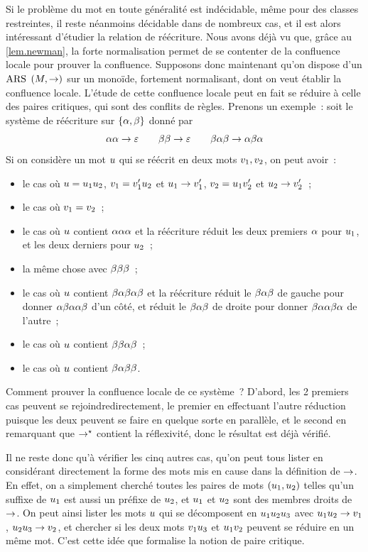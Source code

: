 Si le problème du mot en toute généralité est indécidable, même pour des
classes restreintes, il reste néanmoins décidable dans de nombreux cas, et il
est alors intéressant d'étudier la relation de réécriture. Nous avons déjà vu
que, grâce au \cref{lem.newman}, la forte normalisation permet de se
contenter de la confluence locale pour prouver la confluence. Supposons
donc maintenant qu'on dispose d'un $\operatorname{ARS}$ $(M,\mathrel{\to})$ sur un monoïde,
fortement normalisant, dont on veut établir la confluence locale. L'étude
de cette confluence locale peut en fait se réduire à celle des paires
critiques, qui sont des conflits de règles. Prenons un exemple~:
soit le système de réécriture sur $\{\alpha,\beta\}$ donné par
\[\alpha\alpha \mathrel{\to} \varepsilon \qquad
\beta\beta \mathrel{\to} \varepsilon\qquad
\beta\alpha\beta\mathrel{\to}\alpha\beta\alpha\]
Si on considère un mot $u$ qui se réécrit en deux mots
$v_1,v_2$, on peut avoir~:
\begin{itemize}
\item le cas où $u = u_1u_2$, $v_1=v_1'u_2$
  et $u_1\mathrel{\to}v_1'$, $v_2 = u_1v_2'$ et
  $u_2\mathrel{\to}v_2'$~;
\item le cas où $v_1 = v_2$~;
\item le cas où $u$ contient $\alpha\alpha\alpha$ et la réécriture
  réduit les deux premiers $\alpha$ pour $u_1$, et les deux derniers
  pour $u_2$~;
\item la même chose avec $\beta\beta\beta$~;
\item le cas où $u$ contient $\beta\alpha\beta\alpha\beta$
  et la réécriture réduit le $\beta\alpha\beta$ de gauche pour donner
  $\alpha\beta\alpha\alpha\beta$ d'un côté, et réduit le
  $\beta\alpha\beta$ de droite pour donner
  $\beta\alpha\alpha\beta\alpha$ de l'autre~;
\item le cas où $u$ contient $\beta\beta\alpha\beta$~;
\item le cas où $u$ contient $\beta\alpha\beta\beta$.
\end{itemize}
Comment prouver la confluence locale de ce système~? D'abord, les 2 premiers
cas peuvent se \og rejoindre\fg directement, le premier en effectuant
l'autre réduction puisque les deux peuvent se faire en quelque sorte en
parallèle, et le second en remarquant que $\mathrel{\to}^{\mathord{\star}}$ contient la réflexivité,
donc le résultat est déjà vérifié.

Il ne reste donc qu'à vérifier les cinq autres cas, qu'on peut tous lister en
considérant directement la forme des mots mis en cause dans la définition de
$\mathrel{\to}$. En effet, on a simplement cherché toutes les paires de mots
$(u_1,u_2)$ telles qu'un suffixe de $u_1$ est aussi un préfixe
de $u_2$, et $u_1$ et $u_2$ sont des membres droits de $\mathrel{\to}$.
On peut ainsi lister les mots $u$ qui se décomposent en
$u_1u_2u_3$ avec $u_1u_2 \mathrel{\to} v_1$,
$u_2u_3 \mathrel{\to} v_2$, et chercher si les deux mots
$v_1u_3$ et $u_1v_2$ peuvent se réduire en un même mot.
C'est cette idée que formalise la notion de paire critique.

